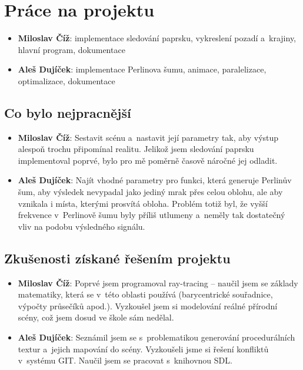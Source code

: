 \documentclass[12pt,a4paper,titlepage,final]{report}
\newcommand\AuthorA{Miloslav Číž}
\newcommand\AuthorB{Aleš Dujíček}
\begin{document}
\chapter{Práce na projektu}

\begin{itemize}
\item \textbf{\AuthorA}: implementace sledování paprsku, vykreslení pozadí a~krajiny, hlavní program, dokumentace
\item \textbf{\AuthorB}: implementace Perlinova šumu, animace, paralelizace, optimalizace, dokumentace
\end{itemize}

\section{Co bylo nejpracnější}


\begin{itemize}
\item \textbf{\AuthorA}: Sestavit scénu a~nastavit její parametry tak,
aby výstup alespoň trochu připomínal realitu. Jelikož jsem sledování
paprsku implementoval poprvé, bylo pro mě poměrně časově náročné jej
odladit.
\item \textbf{\AuthorB}: Najít vhodné parametry pro funkci, která generuje
Perlinův šum, aby výsledek nevypadal jako jediný mrak přes celou oblohu,
ale aby vznikala i místa, kterými prosvítá obloha. Problém totiž byl, že vyšší
frekvence v~Perlinově šumu byly příliš utlumeny a~neměly tak dostatečný vliv
na podobu výsledného signálu.
\end{itemize}

\section{Zkušenosti získané řešením projektu}

\begin{itemize}
\item \textbf{\AuthorA}: Poprvé jsem programoval ray-tracing -- naučil
jsem se základy ma\-te\-ma\-ti\-ky, která se v~této oblasti
používá (barycentrické souřadnice, výpočty průsečíků apod.). Vyzkoušel
jsem si modelování reálné přírodní scény, což jsem dosud ve škole sám
nedělal.
\item \textbf{\AuthorB}: Seznámil jsem se s~problematikou generování
procedurálních textur a~jejich mapování do scény. Vyzkoušeli jsme si
řešení konfliktů v~systému GIT. Naučil jsem se pracovat s~knihovnou SDL.
\end{itemize}
\end{document}
